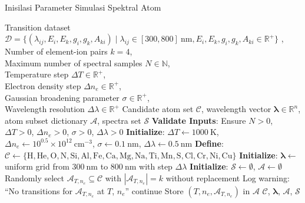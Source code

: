 \begin{algorithm}
\small
\caption{Inisilasi Parameter Simulasi Spektral Atom}
\begin{algorithmic}[1]
  \REQUIRE
    Transition dataset $\mathcal{D} = \{ (\lambda_{ij}, E_i, E_k, g_i, g_k, A_{ki}) \mid \lambda_{ij} \in [300, 800]~\text{nm}, E_i, E_k, g_i, g_k, A_{ki} \in \mathbb{R}^+ \}$ \cite{Kramida2023}, \\
    Number of element-ion pairs $k = 4$, \\
    Maximum number of spectral samples $N \in \mathbb{N}$, \\
    Temperature step $\Delta T \in \mathbb{R}^+$, \\
    Electron density step $\Delta n_e \in \mathbb{R}^+$, \\
    Gaussian broadening parameter $\sigma \in \mathbb{R}^+$, \\
    Wavelength resolution $\Delta \lambda \in \mathbb{R}^+$
  \ENSURE
    Candidate atom set $\mathcal{C}$, wavelength vector $\boldsymbol{\lambda} \in \mathbb{R}^n$, atom subset dictionary $\mathcal{A}$, spectra set $\mathcal{S}$
  \STATE \textbf{Validate Inputs}: Ensure $N > 0$, $\Delta T > 0$, $\Delta n_e > 0$, $\sigma > 0$, $\Delta \lambda > 0$
  \STATE \textbf{Initialize}: $\Delta T \gets 1000~\text{K}$, $\Delta n_e \gets 10^{0.5} \times 10^{12}~\text{cm}^{-3}$, $\sigma \gets 0.1~\text{nm}$, $\Delta \lambda \gets 0.5~\text{nm}$
  \STATE \textbf{Define}: $\mathcal{C} \gets \{\text{H}, \text{He}, \text{O}, \text{N}, \text{Si}, \text{Al}, \text{Fe}, \text{Ca}, \text{Mg}, \text{Na}, \text{Ti}, \text{Mn}, \text{S}, \text{Cl}, \text{Cr}, \text{Ni}, \text{Cu}\}$
  \STATE \textbf{Initialize}: $\boldsymbol{\lambda} \gets$ uniform grid from $300~\text{nm}$ to $800~\text{nm}$ with step $\Delta \lambda$
  \STATE \textbf{Initialize}: $\mathcal{S} \gets \emptyset$, $\mathcal{A} \gets \emptyset$
      \STATE Randomly select $\mathcal{A}_{T,n_e} \subseteq \mathcal{C}$ with $|\mathcal{A}_{T,n_e}| = k$ without replacement
        \STATE Log warning: ``No transitions for $\mathcal{A}_{T,n_e}$ at $T$, $n_e$'' 
        \STATE continue
      \ENDIF
      \STATE Store $(T, n_e, \mathcal{A}_{T,n_e})$ in $\mathcal{A}$
    \ENDFOR
  \ENDFOR
  \STATE \RETURN $\mathcal{C}$, $\boldsymbol{\lambda}$, $\mathcal{A}$, $\mathcal{S}$
\end{algorithmic}
\end{algorithm}


